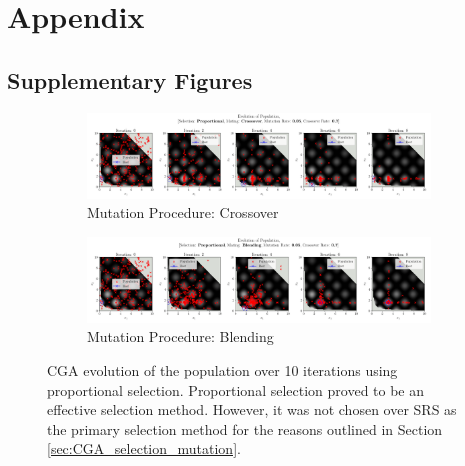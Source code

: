 \documentclass[10pt]{article}
\begin{document}
\section{Appendix}
\subsection{Supplementary Figures}
\begin{figure}[H]
    \centering
    \begin{subfigure}{0.85\textwidth}
        \centering
        \includegraphics[width=\textwidth]{../figures/KBF/10_iters/Proportional/Crossover/0.05_0.7_Population.png}
        \caption{Mutation Procedure: Crossover}
        \label{fig:CGA_flowchart_proportional_crossover}
    \end{subfigure}
    \begin{subfigure}{0.85\textwidth}
        \centering
        \includegraphics[width=\textwidth]{../figures/KBF/10_iters/Proportional/Blending/0.05_0.7_Population.png}
        \caption{Mutation Procedure: Blending}
        \label{fig:CGA_flowchart_proportional_blending}
    \end{subfigure}
    \captionsetup{justification=centering}
    \caption{CGA evolution of the population over 10 iterations using proportional selection. Proportional selection proved to be an effective selection method. However, it was not chosen over SRS as the primary selection method for the reasons outlined in Section \ref{sec:CGA_selection_mutation}.}
    \label{fig:CGA_flowchart_proportional}
\end{figure}
\end{document}
